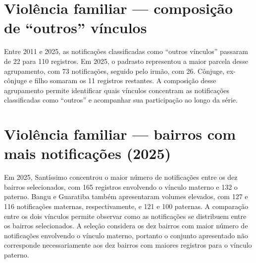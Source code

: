 
\section{Violência familiar — composição de “outros” vínculos}


Entre 2011 e 2025, as notificações classificadas como “outros vínculos” passaram de 22 para 110 registros. Em 2025, o padrasto representou a maior parcela desse agrupamento, com 73 notificações, seguido pelo irmão, com 26. Cônjuge, ex-cônjuge e filho somaram os 11 registros restantes. A composição desse agrupamento permite identificar quais vínculos concentram as notificações classificadas como “outros” e acompanhar sua participação ao longo da série.


\section{Violência familiar — bairros com mais notificações (2025)}


Em 2025, Santíssimo concentrou o maior número de notificações entre os dez bairros selecionados, com 165 registros envolvendo o vínculo materno e 132 o paterno. Bangu e Guaratiba também apresentaram volumes elevados, com 127 e 116 notificações maternas, respectivamente, e 121 e 100 paternas. A comparação entre os dois vínculos permite observar como as notificações se distribuem entre os bairros selecionados. A seleção considera os dez bairros com maior número de notificações envolvendo o vínculo materno, portanto o conjunto apresentado não corresponde necessariamente aos dez bairros com maiores registros para o vínculo paterno.


